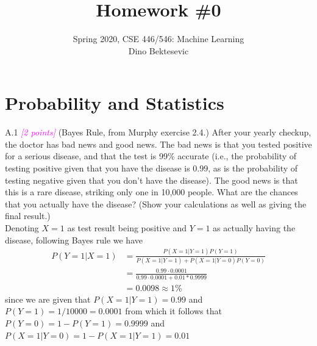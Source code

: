 \documentclass{article}
\date{{}}
\newcommand{\1}{\mathbf{1}}
\newcommand{\points}[1]{\small\textcolor{magenta}{\emph{[#1 points]}} \normalsize}
\begin{document}
\title{Homework \#0 }
\author{\normalsize{Spring 2020, CSE 446/546: Machine Learning}\\
\normalsize{Dino Bektesevic}}
\maketitle


\section*{Probability and Statistics}
A.1 \points{2} (Bayes Rule, from Murphy exercise 2.4.) After your yearly checkup, the doctor has bad news and good news. The bad news is that you tested positive for a serious disease, and that the test is 99\% accurate (i.e., the probability of testing positive given that you have the disease is 0.99, as is the probability of testing negative given that you don't have the disease). The good news is that this is a rare disease, striking only one in 10,000 people. What are the chances that you actually have the disease? (Show your calculations as well as giving the final result.)\\

Denoting $X=1$ as test result being positive and $Y=1$ as actually having the disease, following Bayes rule we have
\begin{align*}
    P(Y=1|X=1) &= \frac{P(X=1|Y=1)P(Y=1)}{P(X=1|Y=1)+P(X=1|Y=0)P(Y=0)} \\
    &= \frac{0.99\cdot0.0001}{0.99\cdot0.0001 + 0.01*0.9999} \\
    &= 0.0098 \approx 1\%
\end{align*}
since we are given that $P(X=1|Y=1)=0.99$ and $P(Y=1)=1/10000=0.0001$ from which it follows that $P(Y=0)=1-P(Y=1)=0.9999$ and $P(X=1|Y=0)=1-P(X=1|Y=1)=0.01$
\end{document}
